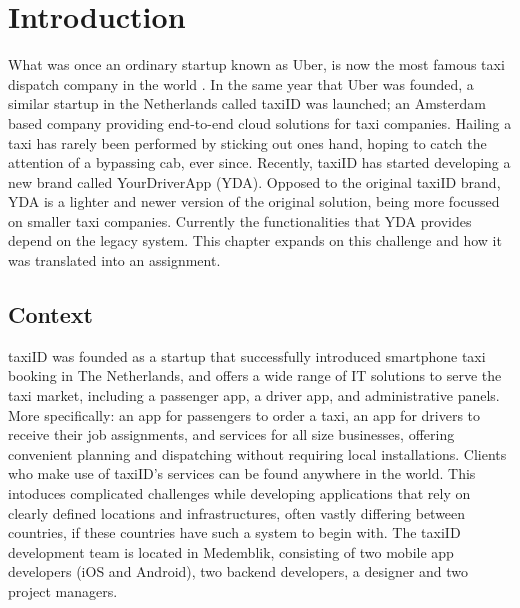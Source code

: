 \graphicspath{{Chapter1/Figs/Vector/}{Chapter1/Figs/}}

%
\chapter{Introduction}
What was once an ordinary startup known as Uber, is now the most famous taxi dispatch company in the world \cite{Uber}. In the same year that Uber was founded, a similar startup in the Netherlands called taxiID was launched; an Amsterdam based company providing end-to-end cloud solutions for taxi companies. Hailing a taxi has rarely been performed by sticking out ones hand, hoping to catch the attention of a bypassing cab, ever since. Recently, taxiID has started developing a new brand called YourDriverApp (YDA). Opposed to the original taxiID brand, YDA is a lighter and newer version of the original solution, being more focussed on smaller taxi companies. Currently the functionalities that YDA provides depend on the legacy system. This chapter expands on this challenge and how it was translated into an assignment.

%
\section{Context}
taxiID was founded as a startup that successfully introduced smartphone taxi booking in The Netherlands, and offers a wide range of IT solutions to serve the taxi market, including a passenger app, a driver app, and administrative panels. More specifically: an app for passengers to order a taxi, an app for drivers to receive their job assignments, and services  for all size businesses, offering convenient planning and dispatching without requiring local installations.
Clients who make use of taxiID's services can be found anywhere in the world. This intoduces complicated challenges while developing applications that rely on clearly defined locations and infrastructures, often vastly differing between countries, if these countries have such a system to begin with.
The taxiID development team is located in Medemblik, consisting of two mobile app developers (iOS and Android), two backend developers, a designer and two project managers.

